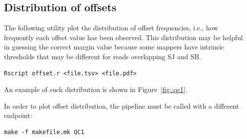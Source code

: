 \documentclass{article}
\begin{document}
\subsection{Distribution of offsets}
The following utility plot the distribution of offset frequencies, i.e., how frequently each offset value has been observed. This distribution may
be helpful in guessing the correct margin value because some mappers have intrinsic thresholds that may be different for reads overlapping SJ and SB.
\begin{verbatim}
Rscript offset.r <file.tsv> <file.pdf>
\end{verbatim}
An example of such distribution is shown in Figure~\ref{fig::qc1}.
\begin{figure}
\end{figure}
In order to plot offset distribution, the pipeline must be called with a different endpoint:
\begin{verbatim}
make -f makefile.mk QC1
\end{verbatim}
\end{document}
